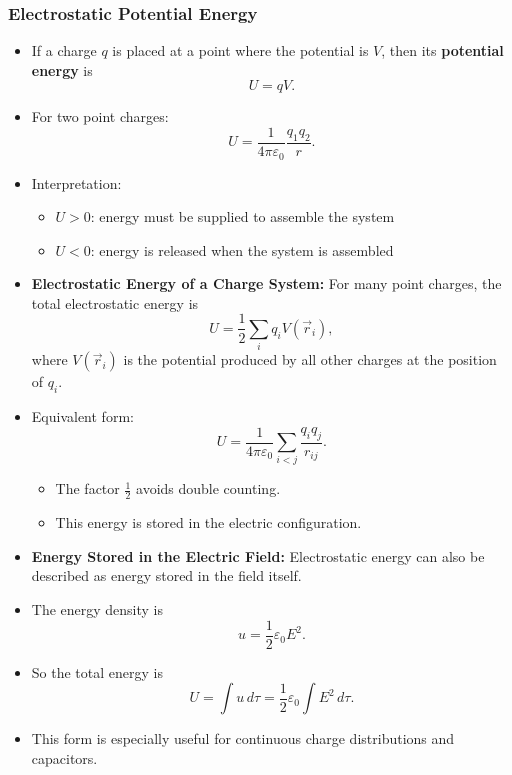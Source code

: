 \documentclass[t,aspectratio=169]{beamer}
\begin{document}
\begin{frame}
\frametitle{Electrostatic Potential Energy}
\begin{itemize}
\setlength{\parskip}{0pt}
\setlength{\itemsep}{4pt}
\item If a charge $q$ is placed at a point where the potential is $V$, then its \textbf{potential energy} is
$$ U = qV.$$

\item For two point charges:
$$ U = \frac{1}{4\pi\varepsilon_0}\frac{q_1 q_2}{r}.$$ 
\item Interpretation:
\begin{itemize}
\item $U>0$: energy must be supplied to assemble the system
\item $U<0$: energy is released when the system is assembled
\end{itemize}

\pagebreak
\item \textbf{Electrostatic Energy of a Charge System:} For many point charges, the total electrostatic energy is
$$
U = \frac{1}{2}\sum_i q_i V(\vec{r}_i),
$$
where $V(\vec{r}_i)$ is the potential produced by all other charges at the position of $q_i$.

\item Equivalent form:
$$
U = \frac{1}{4\pi\varepsilon_0}\sum_{i<j}\frac{q_i q_j}{r_{ij}}.
$$

\begin{itemize}
\item The factor $\tfrac{1}{2}$ avoids double counting.
\item This energy is stored in the electric configuration.
\end{itemize}

\pagebreak
\item \textbf{Energy Stored in the Electric Field:} Electrostatic energy can also be described as energy stored in the field itself.

\item The energy density is
$$ u = \frac{1}{2}\varepsilon_0 E^2. $$

\item So the total energy is
$$ U = \int u\, d\tau = \frac{1}{2}\varepsilon_0 \int E^2\, d\tau. $$

\item This form is especially useful for continuous charge distributions and capacitors.

\end{itemize}
\end{frame}
\end{document}
